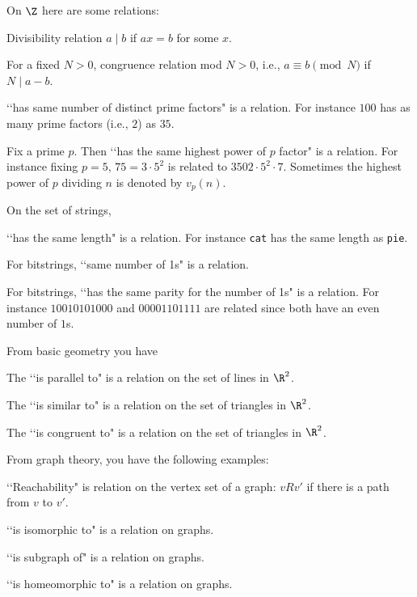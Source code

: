 \begin{eg}
On $\Z$ here are some relations:
\begin{myenum}
\item Divisibility relation 
  $a \mid b$ if $ax = b$ for some $x$.
\item For a fixed $N > 0$, congruence relation mod $N > 0$, i.e.,
  $a \equiv b \pmod{N}$ if $N \mid a - b$.
\item
  \lq\lq has same number of distinct prime factors" is a relation.
  For instance $100$ has as many prime factors (i.e., $2$) as $35$.
\item
  Fix a prime $p$.
  Then \lq\lq has the same highest power of $p$ factor" is a relation.
  For instance fixing $p = 5$, $75 = 3 \cdot 5^2$ is related to
  $3502 \cdot 5^2 \cdot 7$.
  Sometimes the highest power of $p$ dividing $n$ is
  denoted by $v_p(n)$.
\end{myenum}
\end{eg}

\begin{eg}
  On the set of strings,
  \begin{myenum}
  \item  \lq\lq has the same length" is a relation.
    For instance \verb!cat! has the same length as \verb!pie!.
  \item
    For bitstrings, \lq\lq same number of 1s" is a relation.
  \item
    For bitstrings, \lq\lq has the same parity for the number of 1s"
    is a relation.
    For instance $10010101000$ and $00001101111$ are related
    since both have an even number of $1$s.
  \end{myenum}
\end{eg}

\begin{eg}
  From basic geometry you have
  \begin{myenum}
    \item
      The \lq\lq is parallel to" is a relation on the set of lines in $\R^2$.
    \item
      The \lq\lq is similar to" is a relation on the set of triangles in $\R^2$.
    \item
      The \lq\lq is congruent to" is a relation on the set of triangles in
      $\R^2$.
  \end{myenum}
\end{eg}

\begin{eg}
  From graph theory, you have the following examples:
  \begin{myenum}
  \item \lq\lq Reachability" is relation on the vertex set of a graph:
    $v R v'$ if there is a path from $v$ to $v'$.
  \item \lq\lq is isomorphic to" is a relation on graphs.
  \item \lq\lq is subgraph of" is a relation on graphs.
  \item \lq\lq is homeomorphic to" is a relation on graphs.
  \end{myenum}
\end{eg}



